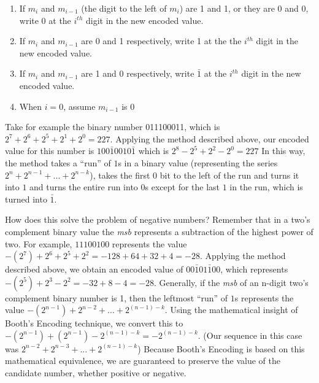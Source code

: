 \documentclass{article}
\begin{document}
\begin{enumerate}
\item If $m_i$ and $m_{i-1}$ (the digit to the left of $m_i$) are 1 and 1, or they are 0 and 0, write 0 at the $i^{th}$ digit in the new encoded value.
\item If $m_i$ and $m_{i-1}$ are 0 and 1 respectively, write 1 at the the $i^{th}$ digit in the new encoded value.
\item If $m_i$ and $m_{i-1}$ are 1 and 0 respectively, write $\bar{1}$ at the $i^{th}$ digit in the new encoded value.
\item When $i = 0$, assume $m_{i-1}$ is 0
\end{enumerate}

Take for example the binary number 011100011, which is $2^7 + 2^6 + 2^5 + 2^1 + 2^0 = 227$.
Applying the method described above, our encoded value for this number is $100\bar{1}0010\bar{1}$ which is $2^8 - 2^5 + 2^2 - 2^0 = 227$
In this way, the method takes a ``run'' of $1$s in a binary value (representing the series $2^{n} + 2^{n-1} + ...
+ 2^{n-k}$), takes the first 0 bit to the left of the run and turns it into $1$ and turns the entire run into $0$s except for the last $1$ in the run, which is turned into $\bar{1}$.

How does this solve the problem of negative numbers?
Remember that in a two's complement binary value the \emph{msb} represents a subtraction of the highest power of two.
For example, $11100100$ represents the value $-(2^{7}) + 2^{6} + 2^{5} + 2^{2} = -128 + 64 + 32 + 4 = -28$.
Applying the method described above, we obtain an encoded value of $00\bar{1}01\bar{1}00$, which represents $-(2^{5}) + 2^{3} - 2^{2} = -32 + 8 - 4 = -28$.
Generally, if the \emph{msb} of an n-digit two's complement binary number is 1, then the leftmost ``run'' of $1$s represents the value $-(2^{n-1}) + 2^{n-2} + ...
+ 2^{(n-1)-k}$.
Using the mathematical insight of Booth's Encoding technique, we convert this to $-(2^{n-1}) + (2^{n-1}) - 2^{(n-1)-k} = -2^{(n-1)-k}$.
(Our sequence in this case was $2^{n-2} + 2^{n-3} + ...
+ 2^{(n-1)-k}$)
Because Booth's Encoding is based on this mathematical equivalence, we are guaranteed to preserve the value of the candidate number, whether positive or negative.
 
\end{document}
